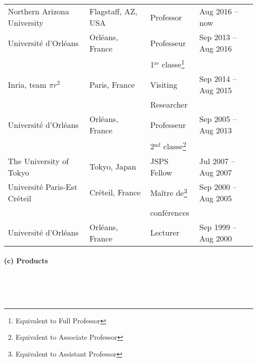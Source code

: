 \documentclass[11pt]{article}
\begin{document}
\begin{tabular}{llll}
  Northern Arizona University & Flagstaff, AZ, USA    & Professor            & Aug 2016 -- now      \\[3pt]
  Université d'Orléans        & Orléans, France       & Professeur           & Sep 2013 -- Aug 2016 \\
                              &                       & 1$^\text{re}$ classe\footnote{Equivalent to Full Professor}\\[3pt]
  Inria, team $\pi r^2$       & Paris, France         & Visiting             & Sep 2014 -- Aug 2015 \\
                              &                       & Researcher           &                      \\[3pt]
  Université d'Orléans        & Orléans, France       & Professeur & Sep 2005 -- Aug 2013 \\
                              &                       & 2$^\text{nd}$ classe\footnote{Equivalent to Associate Professor}&                      \\[3pt]
  The University of Tokyo     & Tokyo, Japan          & JSPS Fellow          & Jul 2007 -- Aug 2007 \\[3pt]
  Université Paris-Est Créteil& Créteil, France       & Maître de\footnote{Equivalent to Assistant Professor}  & Sep 2000 -- Aug 2005 \\
                              &                       &  conférences \\[3pt]             
  Université d'Orléans        & Orléans, France       & Lecturer             & Sep 1999 -- Aug 2000
\end{tabular}


\paragraph{(c) Products} ~

~



\end{document}
